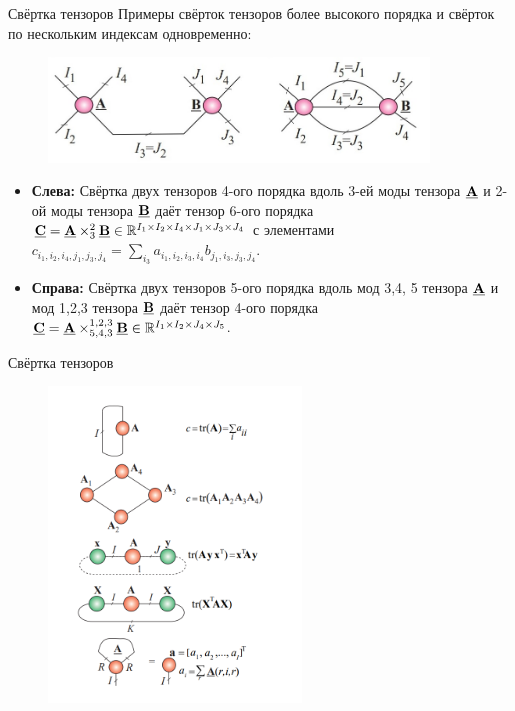 \begin{frame}{Свёртка тензоров}
 Примеры свёрток тензоров более высокого порядка и свёрток по нескольким индексам одновременно:
\begin{figure}
    \centering
    \includegraphics[width=0.9\textwidth]{lecture_10/figs/graph_repr_4.jpg}
\end{figure}

\begin{itemize}
    \item \textbf{Слева:} Свёртка двух тензоров 4-ого порядка вдоль 3-ей моды тензора  $\underline{\textbf{A}}$ и 2-ой моды тензора $\underline{\textbf{B}}$ даёт тензор 6-ого порядка $ \underline{\textbf{C}} = \underline{\textbf{A}} \times_3^2 \underline{\textbf{B}} \in \mathbb{R}^{I_1 \times I_2 \times I_4 \times J_1 \times J_3 \times J_4}$ с элементами $c_{i_1, i_2, i_4, j_1, j_3, j_4} = \sum_{i_3} a_{i_1,i_2, i_3, i_4}b_{j_1, i_3, j_3,j_4}$.
    \item \textbf{Справа:} Свёртка двух тензоров 5-ого порядка вдоль мод 3,4, 5 тензора  $\underline{\textbf{A}}$ и мод 1,2,3 тензора $\underline{\textbf{B}}$ даёт тензор 4-ого порядка $ \underline{\textbf{C}} = \underline{\textbf{A}} \times_{5, 4, 3}^{1, 2, 3} \underline{\textbf{B}} \in \mathbb{R}^{I_1 \times I_2  \times J_4 \times J_5}$.
    
\end{itemize}

\end{frame}

\begin{frame}{Свёртка тензоров}
\begin{figure}
    \centering
    \includegraphics[width=0.6\textwidth]{lecture_10/figs/graph_repr_3.png}
\end{figure}
\end{frame}


